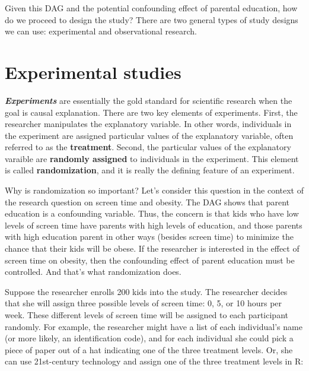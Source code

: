 \documentclass[
]{book}
\begin{document}
Given this DAG and the potential confounding effect of parental education, how do we proceed to design the study? There are two general types of study designs we can use: experimental and observational research.

\section{Experimental studies}\label{experimental-studies}

\textbf{\emph{Experiments}} are essentially the gold standard for scientific research when the goal is causal explanation. There are two key elements of experiments. First, the researcher manipulates the explanatory variable. In other words, individuals in the experiment are assigned particular values of the explanatory variable, often referred to as the \textbf{treatment}. Second, the particular values of the explanatory varaible are \textbf{randomly assigned} to individuals in the experiment. This element is called \textbf{randomization}, and it is really the defining feature of an experiment.

Why is randomization so important? Let's consider this question in the context of the research question on screen time and obesity. The DAG shows that parent education is a confounding variable. Thus, the concern is that kids who have low levels of screen time have parents with high levels of education, and those parents with high education parent in other ways (besides screen time) to minimize the chance that their kids will be obese. If the researcher is interested in the effect of screen time on obesity, then the confounding effect of parent education must be controlled. And that's what randomization does.

Suppose the researcher enrolls 200 kids into the study. The researcher decides that she will assign three possible levels of screen time: 0, 5, or 10 hours per week. These different levels of screen time will be assigned to each participant randomly. For example, the researcher might have a list of each individual's name (or more likely, an identification code), and for each individual she could pick a piece of paper out of a hat indicating one of the three treatment levels. Or, she can use 21st-century technology and assign one of the three treatment levels in R:
\end{document}
